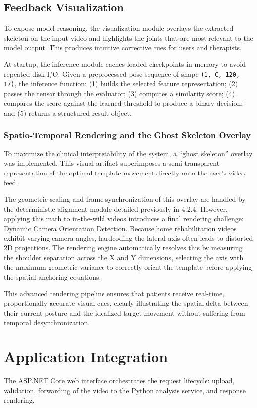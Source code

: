 \subsection{Feedback Visualization}
To expose model reasoning, the visualization module overlays the extracted skeleton on the input video and highlights the joints that are most relevant to the model output. This produces intuitive corrective cues for users and therapists.

At startup, the inference module caches loaded checkpoints in memory to avoid repeated disk I/O. Given a preprocessed pose sequence of shape \texttt{(1, C, 120, 17)}, the inference function: (1) builds the selected feature representation; (2) passes the tensor through the evaluator; (3) computes a similarity score; (4) compares the score against the learned threshold to produce a binary decision; and (5) returns a structured result object.

\subsubsection*{Spatio-Temporal Rendering and the Ghost Skeleton Overlay}
To maximize the clinical interpretability of the system, a “ghost skeleton” overlay was implemented. This visual artifact superimposes a semi-transparent representation of the optimal template movement directly onto the user’s video feed.

The geometric scaling and frame-synchronization of this overlay are handled by the deterministic alignment module detailed previously in 4.2.4. However, applying this math to in-the-wild videos introduces a final rendering challenge: Dynamic Camera Orientation Detection. Because home rehabilitation videos exhibit varying camera angles, hardcoding the lateral axis often leads to distorted 2D projections. The rendering engine automatically resolves this by measuring the shoulder separation across the X and Y dimensions, selecting the axis with the maximum geometric variance to correctly orient the template before applying the spatial anchoring equations.

This advanced rendering pipeline ensures that patients receive real-time, proportionally accurate visual cues, clearly illustrating the spatial delta between their current posture and the idealized target movement without suffering from temporal desynchronization.

\section{Application Integration}
The ASP.NET Core web interface orchestrates the request lifecycle: upload, validation, forwarding of the video to the Python analysis service, and response rendering.

